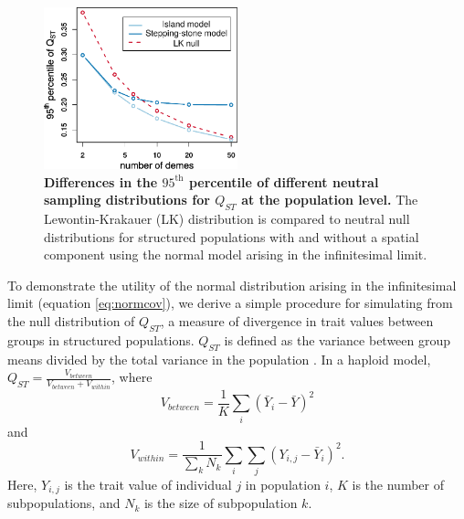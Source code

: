 \begin{figure}
  \centering
  \includegraphics[width=0.5\textwidth]{./figures/qst_deme_percentile_nospace_alt.pdf}
  \caption{\textbf{Differences in the $95^{\mathrm{th}}$ percentile of different
      neutral sampling distributions for $Q_{ST}$ at the population level.} The
    Lewontin-Krakauer (LK) distribution is compared to neutral null
    distributions for structured populations with and without a spatial
    component using the normal model arising in the infinitesimal limit.}
  \label{fig:qst_perc}
\end{figure}


To demonstrate the utility of the normal distribution arising in the
infinitesimal limit (equation \ref{eq:normcov}), we derive a simple procedure
for simulating from the null distribution of $Q_{ST}$, a measure of divergence
in trait values between groups in structured populations. $Q_{ST}$ is defined as
the variance between group means divided by the total variance in the population
\citep{Spitze1993}. In a haploid model, $Q_{ST} = \frac{V_{between}}{V_{between}
  + V_{within}}$, where
\begin{equation*}
  V_{between} = \frac{1}{K} \sum_i \left( \bar{Y}_i - \bar{Y} \right)^2
\end{equation*}
and
\begin{equation*}
  V_{within} = \frac{1}{\sum_k N_k} \sum_i \sum_j \left( Y_{i,j} - \bar{Y}_i \right)^2.
\end{equation*}
Here, $Y_{i,j}$ is the trait value of individual $j$ in population $i$, $K$ is
the number of subpopulations, and $N_k$ is the size of subpopulation $k$.

